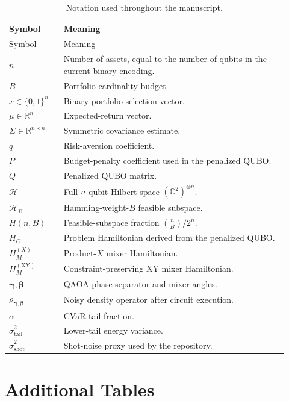 \documentclass[11pt]{article}
\begin{document}
\begin{longtable}{p{0.18\linewidth}p{0.74\linewidth}}
\caption{Notation used throughout the manuscript.}\label{tab:notation}\\
\toprule
Symbol & Meaning \\
\midrule
\endfirsthead
\toprule
Symbol & Meaning \\
\midrule
\endhead
\(n\) & Number of assets, equal to the number of qubits in the current binary encoding. \\
\(B\) & Portfolio cardinality budget. \\
\(x \in \{0,1\}^n\) & Binary portfolio-selection vector. \\
\(\mu \in \mathbb{R}^n\) & Expected-return vector. \\
\(\Sigma \in \mathbb{R}^{n\times n}\) & Symmetric covariance estimate. \\
\(q\) & Risk-aversion coefficient. \\
\(P\) & Budget-penalty coefficient used in the penalized QUBO. \\
\(Q\) & Penalized QUBO matrix. \\
\(\mathcal{H}\) & Full \(n\)-qubit Hilbert space \((\mathbb{C}^2)^{\otimes n}\). \\
\(\mathcal{H}_B\) & Hamming-weight-\(B\) feasible subspace. \\
\(H(n,B)\) & Feasible-subspace fraction \(\binom{n}{B}/2^n\). \\
\(H_C\) & Problem Hamiltonian derived from the penalized QUBO. \\
\(H_M^{(X)}\) & Product-\(X\) mixer Hamiltonian. \\
\(H_M^{(\mathrm{XY})}\) & Constraint-preserving \(\mathrm{XY}\) mixer Hamiltonian. \\
\(\bm{\gamma},\bm{\beta}\) & QAOA phase-separator and mixer angles. \\
\(\rho_{\bm{\gamma},\bm{\beta}}\) & Noisy density operator after circuit execution. \\
\(\alpha\) & CVaR tail fraction. \\
\(\widehat{\sigma}_{\mathrm{tail}}^2\) & Lower-tail energy variance. \\
\(\widehat{\sigma}_{\mathrm{shot}}^2\) & Shot-noise proxy used by the repository. \\
\bottomrule
\end{longtable}

\section{Additional Tables}\label{app:tables}
\end{document}
